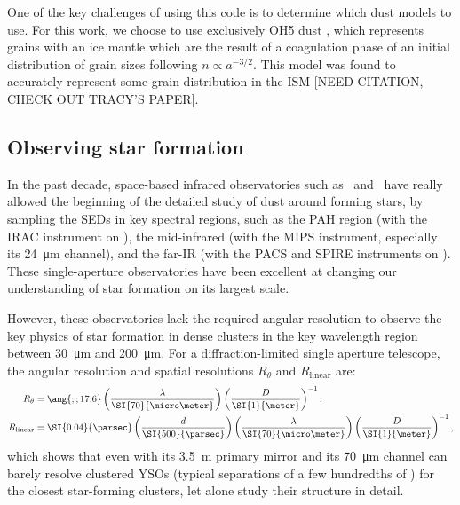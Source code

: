 
One of the key challenges of using this code is to determine which dust models to use. For this work, we choose to use exclusively OH5 dust \citep{Ossenkopf:1994tq}, which represents grains with an ice mantle which are the result of a coagulation phase of an initial distribution of grain sizes following $n\propto a^{-3/2}$. This model was found to accurately represent some grain distribution in the ISM [NEED CITATION, CHECK OUT TRACY'S PAPER].

\subsection{Observing star formation}

In the past decade, space-based infrared observatories such as \Spitzer\ and \Herschel\ have really allowed the beginning of the detailed study of dust around forming stars, by sampling the SEDs in key spectral regions, such as the PAH region (with the IRAC instrument on \Spitzer), the mid-infrared (with the MIPS instrument, especially its \SI{24}{\micro\meter} channel), and the far-IR (with the PACS and SPIRE instruments on \Herschel). These single-aperture observatories have been excellent at changing our understanding of star formation on its largest scale.

However, these observatories lack the required angular resolution to observe the key physics of star formation in dense clusters in the key wavelength region between \SI{30}{\micro\meter} and \SI{200}{\micro\meter}. For a diffraction-limited single aperture telescope, the angular resolution and spatial resolutions $R_\theta$ and $R_\textrm{linear}$ are:
\begin{align}
R_\theta &= \ang{;;17.6}\left(\frac{\lambda}{\SI{70}{\micro\meter}}\right)\left(\frac{D}{\SI{1}{\meter}}\right)^{-1}, \\
R_\textrm{linear} &= \SI{0.04}{\parsec}\left(\frac{d}{\SI{500}{\parsec}}\right)\left(\frac{\lambda}{\SI{70}{\micro\meter}}\right)\left(\frac{D}{\SI{1}{\meter}}\right)^{-1},
\end{align}
which shows that even \Herschel with its \SI{3.5}{\meter} primary mirror and its \SI{70}{\micro\meter} channel can barely resolve clustered YSOs (typical separations of a few hundredths of \si{\parsec}) for the closest star-forming clusters, let alone study their structure in detail. 

